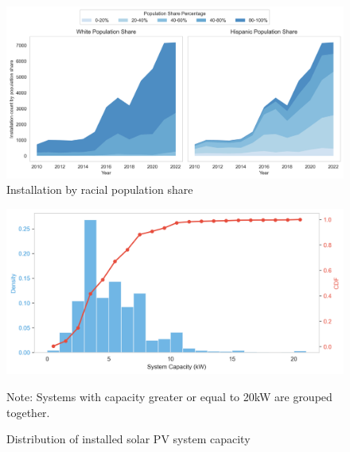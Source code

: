\documentclass[12pt,twoside,letterpaper]{article}
\begin{document}
\begin{figure}[!ht]
    \centering
\includegraphics[width=1\textwidth]{figures/population_quintiles.png}
    \caption{Installation by racial population share}
    \label{fig:population_quintiles}
\end{figure}

\begin{figure}[!ht]
    \centering
\includegraphics[width=1\textwidth]{figures/capacity_density_cdf.png}
    \caption{Distribution  of installed solar PV system capacity}
    \label{fig:capacity_density}
        \begin{flushleft}
        \footnotesize Note: Systems with capacity greater or equal to 20kW are grouped together. 
    \end{flushleft}
\end{figure}
\end{document}
